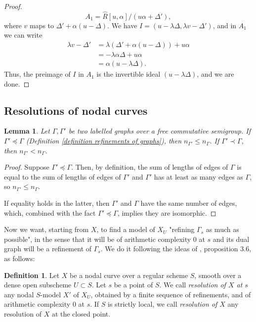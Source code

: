 \documentclass[a4paper,10pt,twoside]{article}
\newtheorem{lem}[thm]{Lemma}
\theoremstyle{definition}
\newtheorem{defi}[thm]{Definition}
\theoremstyle{remark}
\begin{document}
\begin{proof}
\[
A_1=\widehat{R}[u,\alpha]/(u\alpha+\Delta'),
\]
where $v$ maps to $\Delta'+\alpha(u-\Delta)$. We have $I=(u-\lambda\Delta,\lambda v-\Delta')$, and in $A_1$ we can write
\begin{align*}
\lambda v -\Delta' & = \lambda (\Delta'+\alpha(u-\Delta)) +u\alpha \\
& = -\lambda\alpha\Delta+u\alpha \\
& = \alpha(u-\lambda\Delta).
\end{align*}
Thus, the preimage of $I$ in $A_1$ is the invertible ideal $(u-\lambda\Delta)$, and we are done.
\end{proof}


\subsection{Resolutions of nodal curves}

\begin{lem}\label{lemme les raffinements font baisser la complexite}
Let $\Gamma,\Gamma'$ be two labelled graphs over a free commutative semigroup. If $\Gamma'\preceq\Gamma$ (Definition \ref{definition refinements of graphs}), then $n_{\Gamma'}\leq n_\Gamma$. If $\Gamma'\prec\Gamma$, then $n_{\Gamma'}< n_\Gamma$.
\end{lem}

\begin{proof}
Suppose $\Gamma'\preceq\Gamma$. Then, by definition, the sum of lengths of edges of $\Gamma$ is equal to the sum of lengths of edges of $\Gamma'$ and $\Gamma'$ has at least as many edges as $\Gamma$, so $n_{\Gamma'}\leq n_\Gamma$.

If equality holds in the latter, then $\Gamma'$ and $\Gamma$ have the same number of edges, which, combined with the fact $\Gamma'\preceq\Gamma$, implies they are isomorphic.
\end{proof}

Now we want, starting from $X$, to find a model of $X_U$ "refining $\Gamma_s$ as much as possible", in the sense that it will be of arithmetic complexity $0$ at $s$ and its dual graph will be a refinement of $\Gamma_s$. We do it following the ideas of \cite{DeJong}, proposition 3.6, as follows:

\begin{defi}\label{definition resolutions}
	Let $X$ be a nodal curve over a regular scheme $S$, smooth over a dense open subscheme $U\subset S$. Let $s$ be a point of $S$. We call \emph{resolution of $X$ at $s$} any nodal $S$-model $X'$ of $X_U$, obtained by a finite sequence of refinements, and of arithmetic complexity $0$ at $s$. If $S$ is strictly local, we call \emph{resolution of $X$} any resolution of $X$ at the closed point.
\end{defi}
\end{document}
